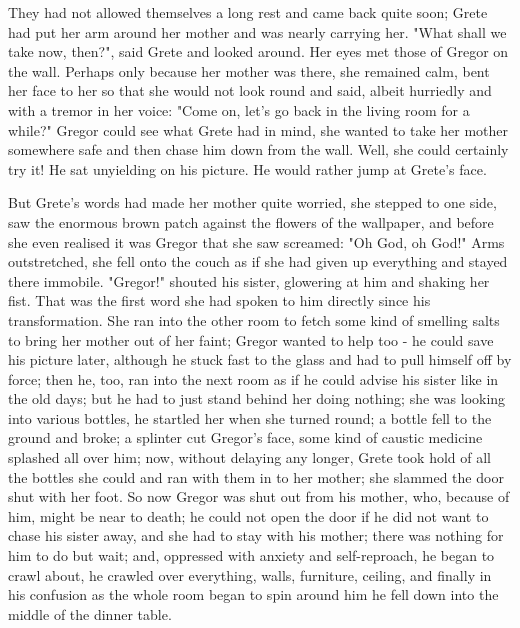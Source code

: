 They had not allowed themselves a long rest and came back quite soon; Grete had put her arm around her mother and was nearly carrying her. "What shall we take now, then?", said Grete and looked around. Her eyes met those of Gregor on the wall. Perhaps only because her mother was there, she remained calm, bent her face to her so that she would not look round and said, albeit hurriedly and with a tremor in her voice: "Come on, let's go back in the living room for a while?" Gregor could see what Grete had in mind, she wanted to take her mother somewhere safe and then chase him down from the wall. Well, she could certainly try it! He sat unyielding on his picture. He would rather jump at Grete's face.

But Grete's words had made her mother quite worried, she stepped to one side, saw the enormous brown patch against the flowers of the wallpaper, and before she even realised it was Gregor that she saw screamed: "Oh God, oh God!" Arms outstretched, she fell onto the couch as if she had given up everything and stayed there immobile. "Gregor!" shouted his sister, glowering at him and shaking her fist. That was the first word she had spoken to him directly since his transformation. She ran into the other room to fetch some kind of smelling salts to bring her mother out of her faint; Gregor wanted to help too - he could save his picture later, although he stuck fast to the glass and had to pull himself off by force; then he, too, ran into the next room as if he could advise his sister like in the old days; but he had to just stand behind her doing nothing; she was looking into various bottles, he startled her when she turned round; a bottle fell to the ground and broke; a splinter cut Gregor's face, some kind of caustic medicine splashed all over him; now, without delaying any longer, Grete took hold of all the bottles she could and ran with them in to her mother; she slammed the door shut with her foot. So now Gregor was shut out from his mother, who, because of him, might be near to death; he could not open the door if he did not want to chase his sister away, and she had to stay with his mother; there was nothing for him to do but wait; and, oppressed with anxiety and self-reproach, he began to crawl about, he crawled over everything, walls, furniture, ceiling, and finally in his confusion as the whole room began to spin around him he fell down into the middle of the dinner table.

